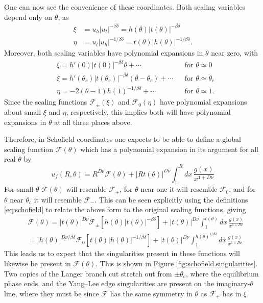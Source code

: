 \documentclass[
  aps,
  pre,
  preprint,
  longbibliography,
  floatfix
]{revtex4-2}
\begin{document}
One can now see the convenience of these coordinates. Both scaling variables depend only on $\theta$, as
\begin{align}
  \xi&=u_h|u_t|^{-\beta\delta}=h(\theta)|t(\theta)|^{-\beta\delta} \\
  \eta&=u_t|u_h|^{-1/\beta\delta}=t(\theta)|h(\theta)|^{-1/\beta\delta}.
\end{align}
Moreover, both scaling variables have polynomial expansions in $\theta$ near zero, with
\begin{align}
  &\xi= h'(0)|t(0)|^{-\beta\delta}\theta+\cdots  && \text{for $\theta\simeq0$}\\
  &\xi=h'(\theta_c)|t(\theta_c)|^{-\beta\delta}(\theta-\theta_c)+\cdots && \text{for $\theta\simeq\theta_c$}
  \\
  &\eta=-2(\theta-1)h(1)^{-1/\beta\delta}+\cdots && \text{for $\theta\simeq1$}.
\end{align}
Since the scaling functions $\mathcal F_\pm(\xi)$ and $\mathcal F_0(\eta)$ have
polynomial expansions about small $\xi$ and $\eta$, respectively, this implies
both will have polynomial expansions in $\theta$ at all three places above.

Therefore, in Schofield coordinates one expects to be able to define a global
scaling function $\mathcal F(\theta)$ which has a polynomial expansion in its
argument for all real $\theta$ by
\begin{equation}
  u_f(R,\theta)=R^{D\nu}\mathcal F(\theta)+|Rt(\theta)|^{D\nu}\int_1^Rdx\,\frac{g(x)}{x^{1+D\nu}}
\end{equation}
For small $\theta$ $\mathcal F(\theta)$ will
resemble $\mathcal F_+$, for $\theta$ near one it will resemble $\mathcal F_0$,
and for $\theta$ near $\theta_c$ it will resemble $\mathcal F_-$. This can be seen explicitly using the definitions \eqref{eq:schofield} to relate the above form to the original scaling functions, giving
\begin{equation} \label{eq:scaling.function.equivalences.2d}
  \begin{aligned}
    &\mathcal F(\theta)
    =|t(\theta)|^{D\nu}\mathcal F_\pm\left[h(\theta)|t(\theta)|^{-\beta\delta}\right]
    +|t(\theta)|^{D\nu}\int_1^{t(\theta)} dx\,\frac{g(x)}{x^{1+D\nu}}\\
    &=|h(\theta)|^{D\nu/\beta\delta}\mathcal F_0\left[t(\theta)|h(\theta)|^{-1/\beta\delta}\right]
    +|t(\theta)|^{D\nu}\int_1^{h(\theta)^{1/\beta\delta}} dx\,\frac{g(x)}{x^{1+D\nu}}
  \end{aligned}
\end{equation}
This leads us
to expect that the singularities present in these functions will likewise be
present in $\mathcal F(\theta)$. This is shown in Figure
\ref{fig:schofield.singularities}. Two copies of the Langer branch cut stretch
out from $\pm\theta_c$, where the equilibrium phase ends, and the Yang--Lee
edge singularities are present on the imaginary-$\theta$ line, where they must be since $\mathcal F$ has the same symmetry in $\theta$ as $\mathcal F_+$ has in $\xi$.
\end{document}
